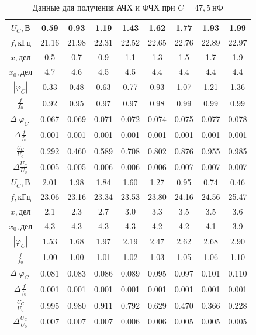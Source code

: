 \documentclass[12pt,a4paper]{article}
\begin{document}
\begin{table}[!ht]\centering
\begin{tabular}{|*{9}{c|}}
\hline
$U_C, \text{В}$&0.59&0.93&1.19&1.43&1.62&1.77&1.93&1.99\\
\hline
$f, \text{кГц}$&21.16&21.98&22.31&22.52&22.65&22.76&22.89&22.97\\
\hline
$x, \text{дел}$&0.5&0.7&0.9&1.1&1.3&1.5&1.7&1.9\\
\hline
$x_0, \text{дел}$&4.7&4.6&4.5&4.5&4.4&4.4&4.4&4.4\\
\hline
$|\varphi_C|$&0.33&0.48&0.63&0.77&0.93&1.07&1.21&1.36\\
\hline
$\frac{f}{f_0}$&0.92&0.95&0.97&0.97&0.98&0.99&0.99&0.99\\
\hline
$\Delta|\varphi_C|$&0.067&0.069&0.071&0.072&0.074&0.075&0.077&0.078\\
\hline
$\Delta \frac{f}{f_0}$&0.001&0.001&0.001&0.001&0.001&0.001&0.001&0.001\\
\hline
$\frac{U_C}{U_0}$&0.292&0.460&0.589&0.708&0.802&0.876&0.955&0.985\\
\hline
$\Delta \frac{U_C}{U_0}$&0.005&0.005&0.006&0.006&0.006&0.007&0.007&0.007\\
\hline
$U_C, \text{В}$&2.01&1.98&1.84&1.60&1.27&0.95&0.74&0.46\\
\hline
$f, \text{кГц}$&23.06&23.16&23.34&23.53&23.80&24.16&24.56&25.47\\
\hline
$x, \text{дел}$&2.1&2.3&2.7&3.0&3.3&3.5&3.5&3.6\\
\hline
$x_0, \text{дел}$&4.3&4.3&4.3&4.3&4.2&4.2&4.1&3.9\\
\hline
$|\varphi_C|$&1.53&1.68&1.97&2.19&2.47&2.62&2.68&2.90\\
\hline
$\frac{f}{f_0}$&1.00&1.00&1.01&1.02&1.03&1.05&1.06&1.10\\
\hline
$\Delta|\varphi_C|$&0.081&0.083&0.086&0.089&0.095&0.097&0.101&0.110\\
\hline
$\Delta \frac{f}{f_0}$&0.001&0.001&0.001&0.001&0.001&0.001&0.001&0.001\\
\hline
$\frac{U_C}{U_0}$&0.995&0.980&0.911&0.792&0.629&0.470&0.366&0.228\\
\hline
$\Delta \frac{U_C}{U_0}$&0.007&0.007&0.007&0.006&0.006&0.005&0.005&0.005\\
\hline
\end{tabular}
\caption{Данные для получения АЧХ и ФЧХ при $C = 47,5~\text{нФ}$}
\end{table}
\end{document}
